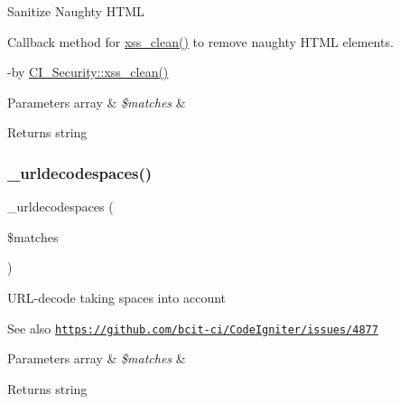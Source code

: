 Sanitize Naughty H\+T\+ML

Callback method for \mbox{\hyperlink{class_c_i___security_acb759426dbab128d3d8164805225381c}{xss\+\_\+clean()}} to remove naughty H\+T\+ML elements.

-\/by \mbox{\hyperlink{class_c_i___security_acb759426dbab128d3d8164805225381c}{C\+I\+\_\+\+Security\+::xss\+\_\+clean()}} 
\begin{DoxyParams}[1]{Parameters}
array & {\em \$matches} & \\
\hline
\end{DoxyParams}
\begin{DoxyReturn}{Returns}
string 
\end{DoxyReturn}
\mbox{\label{class_c_i___security_aed66bb1c40ccc25c96326da7c0e2088a}} 
\subsubsection{\texorpdfstring{\+\_\+urldecodespaces()}{\_urldecodespaces()}}
{\footnotesize\ttfamily \+\_\+urldecodespaces (\begin{DoxyParamCaption}\item[{}]{\$matches }\end{DoxyParamCaption})\hspace{0.3cm}{\ttfamily [protected]}}

U\+R\+L-\/decode taking spaces into account

\begin{DoxySeeAlso}{See also}
\href{https://github.com/bcit-ci/CodeIgniter/issues/4877}{\tt https\+://github.\+com/bcit-\/ci/\+Code\+Igniter/issues/4877} 
\end{DoxySeeAlso}

\begin{DoxyParams}[1]{Parameters}
array & {\em \$matches} & \\
\hline
\end{DoxyParams}
\begin{DoxyReturn}{Returns}
string 
\end{DoxyReturn}
\mbox{\label{class_c_i___security_a55b1380b93b71ab3d9873bb967c2b9bb}} 
